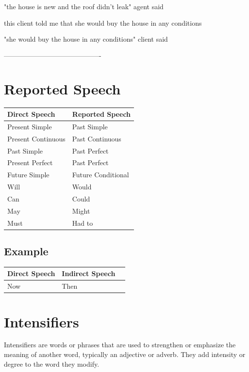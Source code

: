 "the house is new and the roof didn't leak" agent said

this client told me that she would buy the house in any conditions

"she would buy the house in any conditions" client said




-------------------------------------------


\section{Reported Speech}

\begin{longtable}{|l|l|}
    \hline
    \textbf{Direct Speech} & \textbf{Reported Speech} \\ \hline
    \endhead
    Present Simple & Past Simple \\ \hline
    Present Continuous & Past Continuous \\ \hline
    Past Simple & Past Perfect \\ \hline
    Present Perfect & Past Perfect \\ \hline
    Future Simple  & Future Conditional \\ \hline
    Will & Would \\ \hline
    Can & Could \\ \hline
    May & Might \\ \hline
    Must & Had to \\ \hline
\end{longtable}

\subsection{Example}


\begin{longtable}{|l|l|l|}
    \hline
    \textbf{Direct Speech} & \textbf{Indirect Speech} \\ \hline
    \endhead
    Now & Then \\ \hline
\end{longtable}



\section{Intensifiers}

Intensifiers are words or phrases that are used to strengthen or emphasize the meaning of another word, typically an adjective or adverb. They add intensity or degree to the word they modify.

